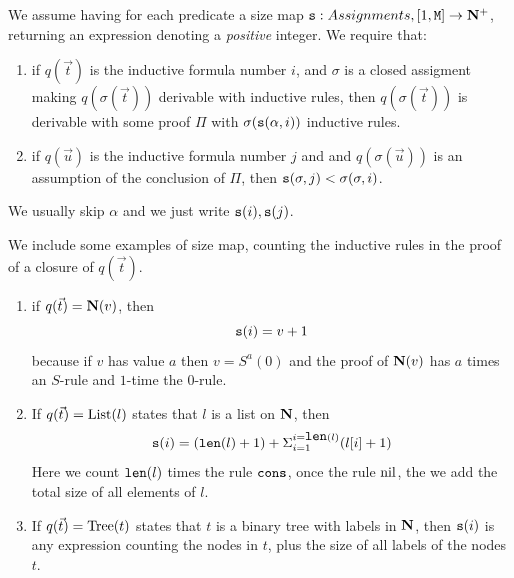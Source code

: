 \documentclass{lmcs}
\newtheorem{lemma}[theorem]{Lemma}
\begin{document}

We assume having for each predicate a size map ${\tt s} : Assignments, 
[1,{\tt M}] \rightarrow {\bf N}^+$, returning an expression denoting a 
\emph{positive} integer. We require that:
\begin{enumerate}
\item
if $q(\vec{t})$ is the inductive formula number $i$, 
and $\sigma$ is a closed assigment making $q(\sigma(\vec{t}))$ derivable with inductive
rules, then $q(\sigma(\vec{t}))$ is derivable with some proof $\Pi$ with
$\sigma({\tt s}(\alpha,i))$ inductive rules.
\item
if $q(\vec{u})$ is the inductive formula number $j$ and
and $q(\sigma(\vec{u}))$ is an assumption
of the conclusion of $\Pi$, then ${\tt s}(\sigma,j) < \sigma(\sigma,i)$. 
\end{enumerate}
We usually skip $\alpha$ and we just write ${\tt s}(i), {\tt s}(j)$.

We include some examples of size map, counting the
inductive rules in the proof of a closure of $q(\vec{t})$.

\begin{enumerate}
\item 
if $q(\vec{t}) = {\bf N}(v)$, then $${\tt s}(i)=v+1$$ because if $v$ has value $a$ 
then $v=S^a(0)$ and the proof of ${\bf N}(v)$ has $a$ times an $S$-rule and $1$-time
the $0$-rule.

\item
If $q(\vec{t}) = {\rm List}(l)$ states that $l$ is a list on ${\bf N}$, 
then $${\tt s}(i) = ({\mbox{\tt len}}(l)+1)+\Sigma_{i=1}^{i={\mbox{\tt len}}(l)}(l[i]+1)$$
Here we count ${\mbox{\tt len}}(l)$ times the rule ${\tt cons}$, once the rule ${{\rm nil}}$,
the we add the total size of all elements of $l$.

\item
If $q(\vec{t}) = {\rm Tree}(t)$ states that $t$ is a binary tree with labels in ${\bf N}$, 
then ${\tt s}(i)$ is any expression counting the nodes in $t$, plus the size
of all labels of the nodes $t$.
\end{enumerate}
\end{document}
